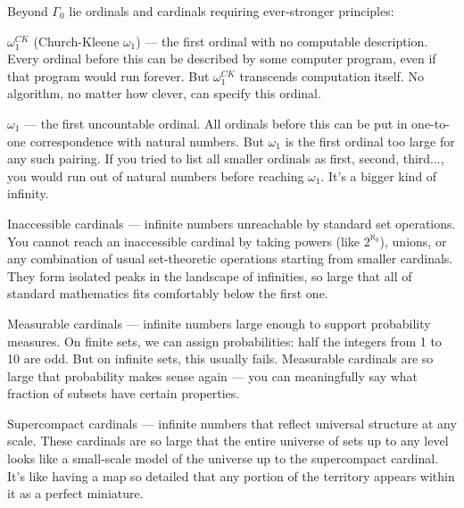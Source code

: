 Beyond $\Gamma_0$ lie ordinals and cardinals requiring ever-stronger principles:

$\omega_1^{CK}$ (Church-Kleene $\omega_1$) — the first ordinal with no computable description. Every ordinal before this can be described by some computer program, even if that program would run forever. But $\omega_1^{CK}$ transcends computation itself. No algorithm, no matter how clever, can specify this ordinal. 

$\omega_1$ — the first uncountable ordinal. All ordinals before this can be put in one-to-one correspondence with natural numbers. But $\omega_1$ is the first ordinal too large for any such pairing. If you tried to list all smaller ordinals as first, second, third..., you would run out of natural numbers before reaching $\omega_1$. It's a bigger kind of infinity.

Inaccessible cardinals — infinite numbers unreachable by standard set operations. You cannot reach an inaccessible cardinal by taking powers (like $2^{\aleph_0}$), unions, or any combination of usual set-theoretic operations starting from smaller cardinals. They form isolated peaks in the landscape of infinities, so large that all of standard mathematics fits comfortably below the first one.

Measurable cardinals — infinite numbers large enough to support probability measures. On finite sets, we can assign probabilities: half the integers from 1 to 10 are odd. But on infinite sets, this usually fails. Measurable cardinals are so large that probability makes sense again — you can meaningfully say what fraction of subsets have certain properties.

Supercompact cardinals — infinite numbers that reflect universal structure at any scale. These cardinals are so large that the entire universe of sets up to any level looks like a small-scale model of the universe up to the supercompact cardinal. It's like having a map so detailed that any portion of the territory appears within it as a perfect miniature.
